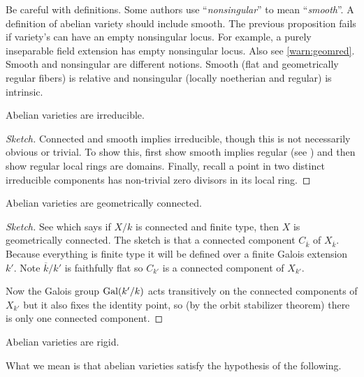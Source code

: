 \documentclass[11pt]{article}
\begin{document}
\begin{warn}\label{warn:smoothvnonsing}
	Be careful with definitions. Some authors use ``\emph{nonsingular}'' to mean ``\emph{smooth}''. A definition of abelian variety should include smooth. The previous proposition fails if variety's can have an empty nonsingular locus. For example, a purely inseparable field extension has empty nonsingular locus. Also see \autoref{warn:geomred}. Smooth and nonsingular are different notions. Smooth (flat and geometrically regular fibers) is relative and nonsingular (locally noetherian and regular) is intrinsic.
\end{warn}

\begin{prop}
	Abelian varieties are irreducible.
\end{prop}
\begin{proof}[Sketch]
	Connected and smooth implies irreducible, though this is not necessarily obvious or trivial. To show this, first show smooth implies regular (see \cite[4.3.32]{liu2006algebraic}) and then show regular local rings are domains. Finally, recall a point in two distinct irreducible components has non-trivial zero divisors in its local ring.
\end{proof}

\begin{prop}
	Abelian varieties are geometrically connected.
\end{prop}
\begin{proof}[Sketch]
	See \cite[Ex.~3.2.11a]{liu2006algebraic} which says if $X/k$ is connected and finite type, then $X$ is geometrically connected. The sketch is that a connected component $C_{\overline{k}}$ of $X_{\overline{k}}$. Because everything is finite type it will be defined over a finite Galois extension $k'$. Note $\overline{k}/k'$ is faithfully flat so $C_{k'}$ is a connected component of $X_{k'}$.
	
	Now the Galois group $\operatorname{Gal}(k'/k)$ acts transitively on the connected components of $X_{k'}$ but it also fixes the identity point, so (by the orbit stabilizer theorem) there is only one connected component.
\end{proof}

\begin{prop}
	Abelian varieties are rigid.
\end{prop}

What we mean is that abelian varieties satisfy the hypothesis of the following.
\end{document}
